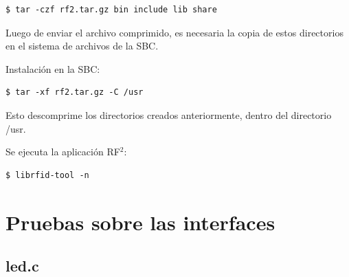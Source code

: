 \begin{verbatim}
$ tar -czf rf2.tar.gz bin include lib share
\end{verbatim}

\bigskip
Luego de enviar el archivo comprimido, es necesaria la copia de estos directorios en el sistema de archivos de la SBC.

\bigskip
Instalación en la SBC:

\begin{verbatim}
$ tar -xf rf2.tar.gz -C /usr
\end{verbatim}

Esto descomprime los directorios creados anteriormente, dentro del directorio /usr.

\bigskip
Se ejecuta la aplicación RF$^{2}$:

\begin{verbatim}
$ librfid-tool -n
\end{verbatim}


\section{Pruebas sobre las interfaces}

\subsection{led.c}\label{anx_sw_led}

